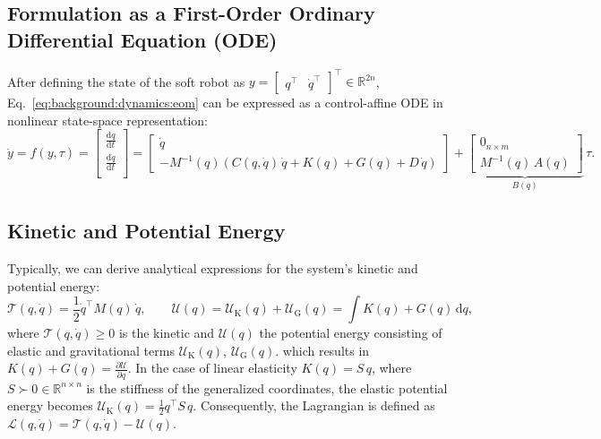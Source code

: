 \subsection{Formulation as a First-Order Ordinary Differential Equation (ODE)}
After defining the state of the soft robot as $y = \begin{bmatrix}
    q^\top & \dot{q}^\top
\end{bmatrix}^\top \in \mathbb{R}^{2n}$, Eq.~\ref{eq:background:dynamics:eom} can be expressed as a control-affine \gls{ODE} in nonlinear state-space representation:
\begin{equation}
    \dot{y} = f(y,\tau) = \begin{bmatrix}
        \frac{\mathrm{d} q}{\mathrm{d}t}\\
        \frac{\mathrm{d} \dot{q}}{\mathrm{d}t}\\
    \end{bmatrix} = \begin{bmatrix}
        \dot{q}\\
        -M^{-1}(q) \left ( C(q,\dot{q}) \, \dot{q} + K(q) + G(q) + D \, \dot{q} \right )
    \end{bmatrix} + \underbrace{\begin{bmatrix}
        0_{n \times m}\\ M^{-1}(q) \, A(q)
    \end{bmatrix}}_{B(q)} \, \tau.
\end{equation}

\subsection{Kinetic and Potential Energy}
Typically, we can derive analytical expressions for the system’s kinetic and potential energy:
\begin{equation}
    \mathcal{T}(q,\dot{q}) = \frac{1}{2} \dot{q}^\top M(q) \, \dot{q},
    \qquad
    \mathcal{U}(q) = \mathcal{U}_\mathrm{K}(q) + \mathcal{U}_\mathrm{G}(q) = \int K(q) + G(q) \, \mathrm{d}q,
\end{equation}
where $\mathcal{T}(q,\dot{q}) \geq 0$ is the kinetic and $\mathcal{U}(q)$ the potential energy consisting of elastic and gravitational terms $\mathcal{U}_\mathrm{K}(q)$, $\mathcal{U}_\mathrm{G}(q)$.
which results in $K(q) + G(q) = \frac{\partial \mathcal{U}}{\partial q}$. 
In the case of linear elasticity $K(q) = S \, q$, where $S \succ 0 \in \mathbb{R}^{n \times n}$ is the stiffness of the generalized coordinates, the elastic potential energy becomes $\mathcal{U}_\mathrm{K}(q) = \frac{1}{2} q^\top S \, q$.
Consequently, the Lagrangian is defined as $\mathcal{L}(q,\dot{q}) = \mathcal{T}(q,\dot{q}) - \mathcal{U}(q)$.

